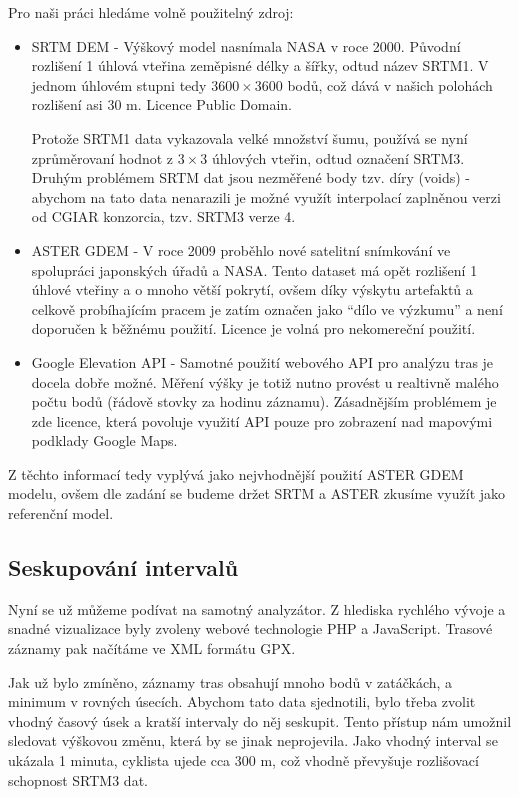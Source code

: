 \documentclass[thesis=B,czech]{FITthesis}[2012/06/26]
\begin{document}
Pro naši práci hledáme volně použitelný zdroj:
\begin{itemize}
\item{SRTM DEM - Výškový model nasnímala NASA v roce 2000. Původní rozlišení 1 úhlová vteřina zeměpisné délky a šířky, odtud název SRTM1. V jednom úhlovém stupni tedy $3600 \times 3600$ bodů, což dává v našich polohách rozlišení asi 30 m. Licence Public Domain.

Protože SRTM1 data vykazovala velké množství šumu, používá se nyní zprůměrovaní hodnot z $3 \times 3$ úhlových vteřin, odtud označení SRTM3. \cite{dem-srtm} Druhým problémem SRTM dat jsou nezměřené body tzv. díry (voids) - abychom na tato data nenarazili je možné využít interpolací zaplněnou verzi od CGIAR konzorcia, tzv. SRTM3 verze 4. \cite{dem-srtm-cgiar}
}

\item{ASTER GDEM - V roce 2009 proběhlo nové satelitní snímkování ve spolupráci japonských úřadů a NASA. Tento dataset má opět rozlišení 1 úhlové vteřiny a o mnoho větší pokrytí, ovšem díky výskytu artefaktů a celkově probíhajícím pracem je zatím označen jako “dílo ve výzkumu” a není doporučen k běžnému použití. Licence je volná pro nekomereční použití. \cite{dem-aster}}

\item{Google Elevation API - Samotné použití webového API pro analýzu tras je docela dobře možné. Měření výšky je totiž nutno provést u realtivně malého počtu bodů (řádově stovky za hodinu záznamu). Zásadnějším problémem je zde licence, která povoluje využití API pouze pro zobrazení nad mapovými podklady Google Maps. \cite{dem-google}}
\end{itemize}

Z těchto informací tedy vyplývá jako nejvhodnější použití ASTER GDEM modelu, ovšem dle zadání se budeme držet SRTM a ASTER zkusíme využít jako referenční model.

\subsection{Seskupování intervalů} 
\label{seskupovani}
Nyní se už můžeme podívat na samotný analyzátor. Z hlediska rychlého vývoje a snadné vizualizace byly zvoleny webové technologie PHP a JavaScript. Trasové záznamy pak načítáme ve XML formátu GPX.


Jak už bylo zmíněno, záznamy tras obsahují mnoho bodů v zatáčkách, a minimum v rovných úsecích. Abychom tato data sjednotili, bylo třeba zvolit vhodný časový úsek a kratší intervaly do něj seskupit. Tento přístup nám umožnil sledovat výškovou změnu, která by se jinak neprojevila. Jako vhodný interval se ukázala 1 minuta, cyklista ujede cca 300 m, což vhodně převyšuje rozlišovací schopnost SRTM3 dat.
\end{document}
